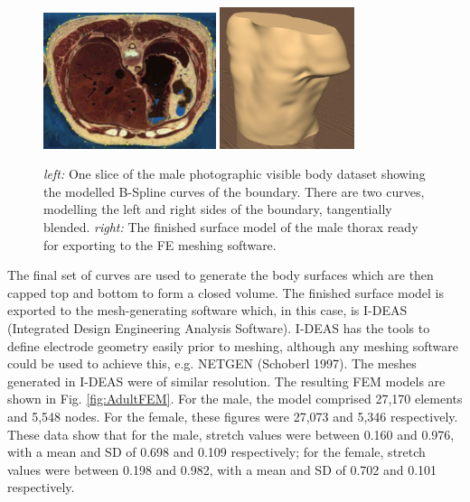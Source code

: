 \documentclass[12pt]{iopart}
\begin{document}
\begin{figure}[bhtp]
\begin{center}
  \includegraphics[width= 0.45\textwidth]
         {figures/adult-slice.jpg}
  \includegraphics[width= 0.35\textwidth]
         {figures/adult-model.jpg}

\caption{ \label{fig:Adultmodel}
{\em left:} One slice of the male photographic visible body dataset showing the modelled B-Spline curves of the boundary.  There are two curves, modelling the left and right sides of the boundary, tangentially blended.
{\em right:} The finished surface model of the male thorax ready for exporting to the FE meshing software.
}
\end{center}
\end{figure}

The final set of curves are used to generate the body surfaces which are
then capped top and bottom to form a closed volume. The finished surface
model is exported to the mesh-generating software which, in this case,
is I-DEAS (Integrated Design Engineering Analysis Software).
I-DEAS has the tools to define electrode geometry easily prior to meshing,
although any meshing software could be used to achieve this,
e.g. NETGEN (Schoberl 1997).
The meshes generated in I-DEAS were of similar resolution.  The
resulting FEM models are shown in Fig. \ref{fig:AdultFEM}.
For the male, the model comprised 27,170 elements and 5,548 nodes.
For the female, these figures were 27,073 and 5,346 respectively.
These data show that for the male, stretch values were between 0.160
and 0.976, with a mean and SD of 0.698 and 0.109 respectively; for
the female, stretch values were between 0.198 and 0.982, with a mean and
SD of 0.702 and 0.101 respectively.
\end{document}
